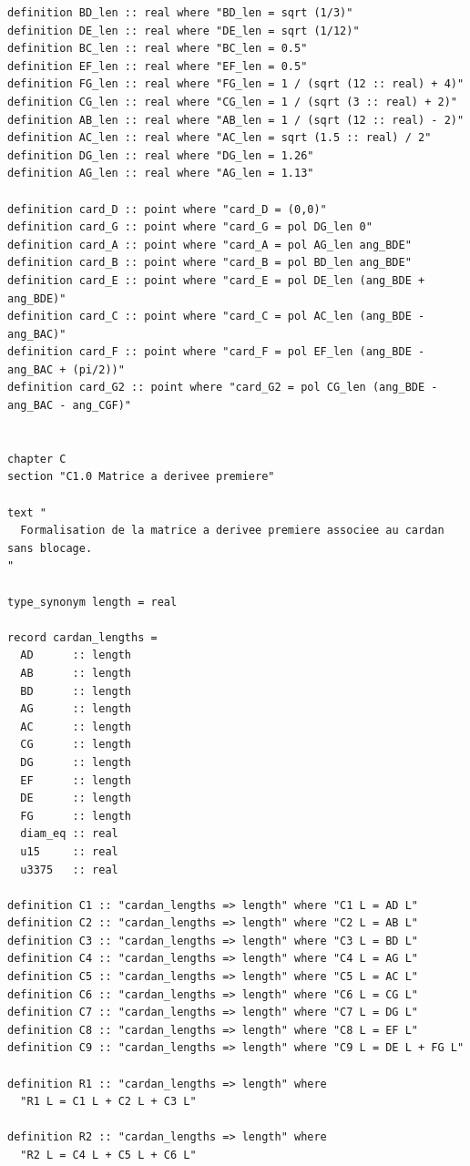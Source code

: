 \documentclass[12pt,a4paper]{article}
\theoremstyle{definition}
\theoremstyle{remark}
\begin{document}
\begin{verbatim}
definition BD_len :: real where "BD_len = sqrt (1/3)"
definition DE_len :: real where "DE_len = sqrt (1/12)"
definition BC_len :: real where "BC_len = 0.5"
definition EF_len :: real where "EF_len = 0.5"
definition FG_len :: real where "FG_len = 1 / (sqrt (12 :: real) + 4)"
definition CG_len :: real where "CG_len = 1 / (sqrt (3 :: real) + 2)"
definition AB_len :: real where "AB_len = 1 / (sqrt (12 :: real) - 2)"
definition AC_len :: real where "AC_len = sqrt (1.5 :: real) / 2"
definition DG_len :: real where "DG_len = 1.26"
definition AG_len :: real where "AG_len = 1.13"

definition card_D :: point where "card_D = (0,0)"
definition card_G :: point where "card_G = pol DG_len 0"
definition card_A :: point where "card_A = pol AG_len ang_BDE"
definition card_B :: point where "card_B = pol BD_len ang_BDE"
definition card_E :: point where "card_E = pol DE_len (ang_BDE + ang_BDE)"
definition card_C :: point where "card_C = pol AC_len (ang_BDE - ang_BAC)"
definition card_F :: point where "card_F = pol EF_len (ang_BDE - ang_BAC + (pi/2))"
definition card_G2 :: point where "card_G2 = pol CG_len (ang_BDE - ang_BAC - ang_CGF)"


chapter C
section "C1.0 Matrice a derivee premiere"

text "
  Formalisation de la matrice a derivee premiere associee au cardan sans blocage.
"

type_synonym length = real

record cardan_lengths =
  AD      :: length
  AB      :: length
  BD      :: length
  AG      :: length
  AC      :: length
  CG      :: length
  DG      :: length
  EF      :: length
  DE      :: length
  FG      :: length
  diam_eq :: real
  u15     :: real
  u3375   :: real

definition C1 :: "cardan_lengths => length" where "C1 L = AD L"
definition C2 :: "cardan_lengths => length" where "C2 L = AB L"
definition C3 :: "cardan_lengths => length" where "C3 L = BD L"
definition C4 :: "cardan_lengths => length" where "C4 L = AG L"
definition C5 :: "cardan_lengths => length" where "C5 L = AC L"
definition C6 :: "cardan_lengths => length" where "C6 L = CG L"
definition C7 :: "cardan_lengths => length" where "C7 L = DG L"
definition C8 :: "cardan_lengths => length" where "C8 L = EF L"
definition C9 :: "cardan_lengths => length" where "C9 L = DE L + FG L"

definition R1 :: "cardan_lengths => length" where
  "R1 L = C1 L + C2 L + C3 L"

definition R2 :: "cardan_lengths => length" where
  "R2 L = C4 L + C5 L + C6 L"


\end{verbatim}
\end{document}
